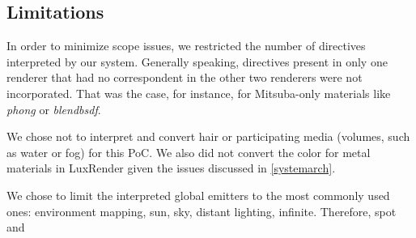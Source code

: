 
\subsection{Limitations}
In order to minimize scope issues, we restricted the number of directives 
interpreted by our system. Generally speaking, directives present in only one 
renderer that had no correspondent in the other two renderers were not 
incorporated. That was the case, for instance, for Mitsuba-only materials like 
\textit{phong} or \textit{blendbsdf}. 

We chose not to interpret and convert hair or participating media (volumes, such 
as water or fog) for this PoC. We also did not convert the color for metal 
materials in LuxRender given the issues discussed in \ref{systemarch}.

We chose to limit the interpreted global emitters to the most commonly used 
ones: environment mapping, sun, sky, distant lighting, infinite. Therefore, spot 
and 



